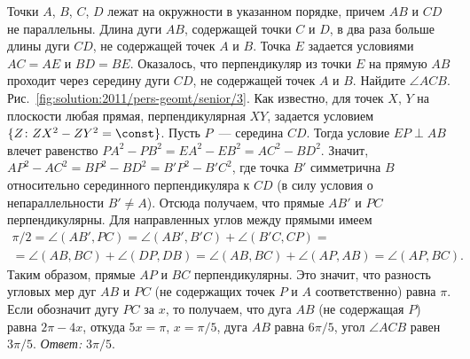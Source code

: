 \problem
Точки $A$, $B$, $C$, $D$ лежат на окружности в указанном порядке, причем $AB$ и
$CD$ не параллельны.
Длина дуги $AB$, содержащей точки $C$ и $D$, в два раза больше длины дуги $CD$,
не содержащей точек $A$ и $B$.
Точка $E$ задается условиями $AC = AE$ и $BD = BE$.
Оказалось, что перпендикуляр из точки $E$ на прямую $AB$ проходит через
середину дуги $CD$, не содержащей точек $A$ и $B$.
Найдите $\angle ACB$.
%
\label{solution:2011/pers-geomt/senior/3}%
Рис.~\ref{fig:solution:2011/pers-geomt/senior/3}.
Как известно, для точек $X$, $Y$ на плоскости любая прямая, перпендикулярная
$XY$, задается условием
$\{Z \colon ZX^2 - ZY^2 = \const\}$.
Пусть $P$~--- середина $CD$.
Тогда условие $EP \perp AB$ влечет равенство
$P A^2 - P B^2 = E A^2 - E B^2 = A C^2 - B D^2$.
Значит, $A P^2 - A C^2 = B P^2 - B D^2 = B' P^2 - B' C^2$, где точка $B'$
симметрична $B$ относительно серединного перпендикуляра к $CD$
(в силу условия о непараллельности $B' \neq A$).
Отсюда получаем, что прямые $AB'$ и $PC$ перпендикулярны.
Для направленных углов между прямыми имеем 
\begin{gather*}
    \pi / 2
=
    \angle (AB', PC)
=
    \angle (AB', B'C) + \angle (B'C, CP)
=\\=
    \angle (AB, BC) + \angle (DP, DB)
=
    \angle (AB, BC) + \angle (AP, AB)
=
    \angle (AP, BC)
.\end{gather*}
Таким образом, прямые $AP$ и $BC$ перпендикулярны.
Это значит, что разность угловых мер дуг $AB$ и $PC$
(не содержащих точек $P$ и $A$ соответственно) равна $\pi$.
Если обозначит дугу $PC$ за $x$, то получаем, что дуга $AB$
(не содержащая $P$) равна $2 \pi - 4 x$, откуда $5 x = \pi$, $x = \pi / 5$,
дуга $AB$ равна $6 \pi / 5$, угол $\angle ACB$ равен $3 \pi / 5$.
\emph{Ответ:} $3 \pi / 5$.
\endproblem
